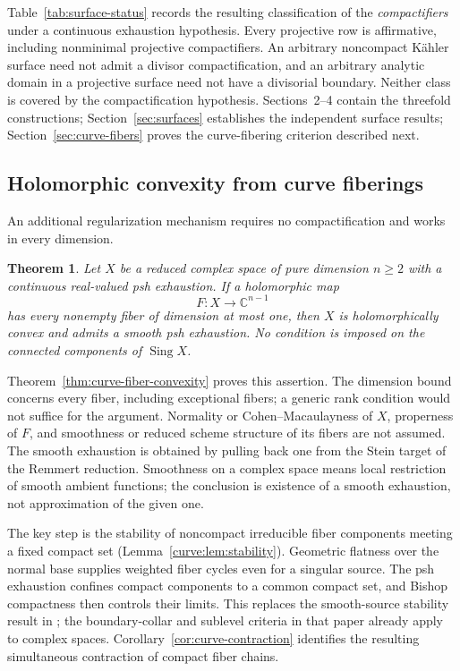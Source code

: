 \documentclass[11pt]{amsart}
\newtheorem{theorem}{Theorem}[section]
\theoremstyle{definition}
\theoremstyle{remark}
\numberwithin{equation}{section}
\newcommand{\C}{\mathbb C}
\begin{document}
Table~\ref{tab:surface-status} records the resulting
classification of the \emph{compactifiers} under a continuous
exhaustion hypothesis.  Every projective row is affirmative, including
nonminimal projective compactifiers.  An arbitrary noncompact
K\"ahler surface need not admit a divisor compactification, and an
arbitrary analytic domain in a projective surface need not have a
divisorial boundary.  Neither class is covered by the compactification
hypothesis.  Sections~2--4 contain the threefold constructions;
Section~\ref{sec:surfaces} establishes the independent surface results;
Section~\ref{sec:curve-fibers} proves the curve-fibering criterion
described next.

\subsection{Holomorphic convexity from curve fiberings}
An additional regularization mechanism requires no compactification
and works in every dimension.

\begin{theorem}\label{thm:curve-fiber-introduction}
Let $X$ be a reduced complex space of pure dimension $n\ge2$ with
a continuous real-valued psh exhaustion.  If a holomorphic map
\[
 F:X\longrightarrow\C^{n-1}
\]
has every nonempty fiber of dimension at most one, then $X$ is
holomorphically convex and admits a smooth psh exhaustion.
No condition is imposed on the connected components of
$\operatorname{Sing}X$.
\end{theorem}

Theorem~\ref{thm:curve-fiber-convexity} proves this assertion.
The dimension bound concerns every fiber, including exceptional
fibers; a generic rank condition would not suffice for the argument.
Normality or Cohen--Macaulayness of $X$, properness of $F$, and
smoothness or reduced scheme structure of its fibers are not assumed.
The smooth exhaustion is obtained by pulling back one from the Stein
target of the Remmert reduction.  Smoothness on a complex space means
local restriction of smooth ambient functions; the conclusion is
existence of a smooth exhaustion, not approximation of the given one.

The key step is the stability of noncompact irreducible fiber
components meeting a fixed compact set
(Lemma~\ref{curve:lem:stability}).
Geometric flatness over the normal base supplies weighted fiber
cycles even for a singular source.  The psh exhaustion confines
compact components to a common compact set, and Bishop compactness
then controls their limits.  This replaces the smooth-source
stability result in \cite[Corollary~4.2]{VijituForum2022};
the boundary-collar and sublevel criteria in that paper already
apply to complex spaces.  Corollary~\ref{cor:curve-contraction}
identifies the resulting simultaneous contraction of compact
fiber chains.
\end{document}
